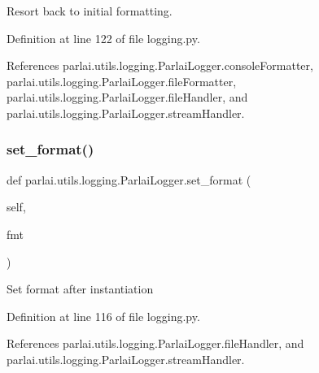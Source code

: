 \begin{DoxyVerb}Resort back to initial formatting.\end{DoxyVerb}
 

Definition at line 122 of file logging.\+py.



References parlai.\+utils.\+logging.\+Parlai\+Logger.\+console\+Formatter, parlai.\+utils.\+logging.\+Parlai\+Logger.\+file\+Formatter, parlai.\+utils.\+logging.\+Parlai\+Logger.\+file\+Handler, and parlai.\+utils.\+logging.\+Parlai\+Logger.\+stream\+Handler.

\mbox{\label{classparlai_1_1utils_1_1logging_1_1ParlaiLogger_a1066ef97668ebb94d3204ccac1bed8f6}} 
\subsubsection{\texorpdfstring{set\+\_\+format()}{set\_format()}}
{\footnotesize\ttfamily def parlai.\+utils.\+logging.\+Parlai\+Logger.\+set\+\_\+format (\begin{DoxyParamCaption}\item[{}]{self,  }\item[{}]{fmt }\end{DoxyParamCaption})}

\begin{DoxyVerb}Set format after instantiation\end{DoxyVerb}
 

Definition at line 116 of file logging.\+py.



References parlai.\+utils.\+logging.\+Parlai\+Logger.\+file\+Handler, and parlai.\+utils.\+logging.\+Parlai\+Logger.\+stream\+Handler.

\mbox{\label{classparlai_1_1utils_1_1logging_1_1ParlaiLogger_ad9b882180fc5cc0b81351f50d7fcd252}} 
